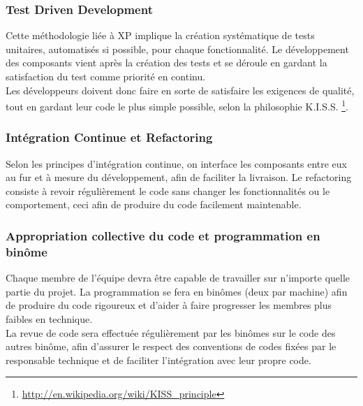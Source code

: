 \documentclass{../../res/univ-projet}
\begin{document}
\subsubsection{Test Driven Development}
	Cette méthodologie liée à XP implique la création systématique de tests unitaires, automatisés si possible, pour chaque fonctionnalité. Le développement des composants vient après la création des tests et se déroule en gardant la satisfaction du test comme priorité en continu.\\

	Les développeurs doivent donc faire en sorte de satisfaire les exigences de qualité, tout en gardant leur code le plus simple possible, selon la philosophie K.I.S.S. \footnote{\href{http://en.wikipedia.org/wiki/KISS\_principle}{http://en.wikipedia.org/wiki/KISS\_principle}}.
	 
\subsubsection{Intégration Continue et Refactoring}
	Selon les principes d'intégration continue, on interface les composants entre eux au fur et à mesure du développement, afin de faciliter la livraison. Le refactoring  consiste à revoir régulièrement le code sans changer les fonctionnalités ou le comportement, ceci afin de produire du code facilement maintenable.

\subsubsection{Appropriation collective du code et programmation en binôme}
	Chaque membre de l'équipe devra être capable de travailler sur n'importe quelle partie du projet. La programmation se fera en binômes (deux par machine) afin de produire du code rigoureux et d'aider à faire progresser les membres plus faibles en technique. \\

	La revue de code sera effectuée régulièrement	par les binômes sur le code des autres binôme, afin d'assurer le respect des conventions de codes fixées par le responsable technique et de faciliter l'intégration avec leur propre code.
\end{document}

